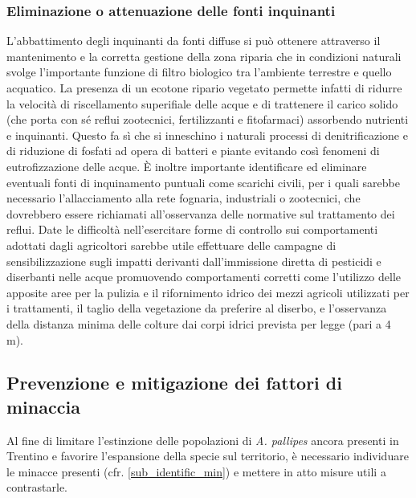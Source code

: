 \documentclass[11pt,a4paper,italian,twoside,openany]{memoir}
\begin{document}
\subsubsection{Eliminazione o attenuazione delle fonti inquinanti}
L'abbattimento degli inquinanti da fonti diffuse si può ottenere attraverso il mantenimento e la corretta gestione della zona riparia che in condizioni naturali svolge l'importante funzione di filtro biologico tra l'ambiente terrestre e quello acquatico. La presenza di un ecotone ripario vegetato permette infatti di ridurre la velocità di riscellamento superifiale delle acque e di trattenere il carico solido (che porta con sé reflui zootecnici, fertilizzanti e fitofarmaci) assorbendo nutrienti e inquinanti. Questo fa sì che si inneschino i naturali processi di denitrificazione e di riduzione di fosfati ad opera di batteri e piante evitando così fenomeni di eutrofizzazione delle acque. È inoltre importante identificare ed eliminare eventuali fonti di inquinamento puntuali come scarichi  civili, per i quali sarebbe necessario l'allacciamento alla rete fognaria, industriali o zootecnici, che dovrebbero essere richiamati all'osservanza delle normative sul trattamento dei reflui. Date le difficoltà nell'esercitare forme di controllo sui comportamenti adottati dagli agricoltori sarebbe utile effettuare delle campagne di sensibilizzazione sugli impatti derivanti dall'immissione diretta di pesticidi e diserbanti nelle acque promuovendo comportamenti corretti come l'utilizzo delle apposite aree per la pulizia e il rifornimento idrico dei mezzi agricoli utilizzati per i trattamenti, il taglio della vegetazione da preferire al diserbo, e l'osservanza della distanza minima delle colture dai corpi idrici prevista per legge (pari a 4 m).

\subsection{Prevenzione e mitigazione dei fattori di minaccia}
\label{sub_prev}
Al fine di limitare l'estinzione delle popolazioni di \emph{A. pallipes} ancora presenti in Trentino e favorire l'espansione della specie sul territorio, è necessario individuare le minacce presenti (cfr. \ref{sub_identific_min}) e mettere in atto misure utili a contrastarle. 
\end{document}
